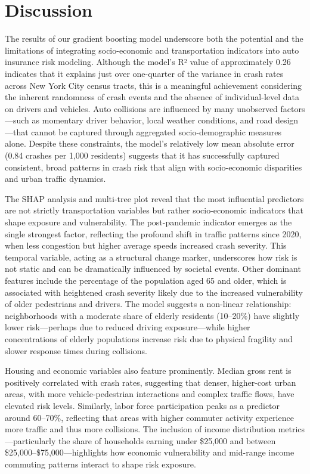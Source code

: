 \documentclass[
  number,
  review,
  3p]{elsarticle}
\begin{document}
\section{Discussion}\label{discussion}

The results of our gradient boosting model underscore both the potential
and the limitations of integrating socio-economic and transportation
indicators into auto insurance risk modeling. Although the model's R²
value of approximately 0.26 indicates that it explains just over
one-quarter of the variance in crash rates across New York City census
tracts, this is a meaningful achievement considering the inherent
randomness of crash events and the absence of individual-level data on
drivers and vehicles. Auto collisions are influenced by many unobserved
factors---such as momentary driver behavior, local weather conditions,
and road design---that cannot be captured through aggregated
socio-demographic measures alone. Despite these constraints, the model's
relatively low mean absolute error (0.84 crashes per 1,000 residents)
suggests that it has successfully captured consistent, broad patterns in
crash risk that align with socio-economic disparities and urban traffic
dynamics.

The SHAP analysis and multi-tree plot reveal that the most influential
predictors are not strictly transportation variables but rather
socio-economic indicators that shape exposure and vulnerability. The
post-pandemic indicator emerges as the single strongest factor,
reflecting the profound shift in traffic patterns since 2020, when less
congestion but higher average speeds increased crash severity. This
temporal variable, acting as a structural change marker, underscores how
risk is not static and can be dramatically influenced by societal
events. Other dominant features include the percentage of the population
aged 65 and older, which is associated with heightened crash severity
likely due to the increased vulnerability of older pedestrians and
drivers. The model suggests a non-linear relationship: neighborhoods
with a moderate share of elderly residents (10--20\%) have slightly
lower risk---perhaps due to reduced driving exposure---while higher
concentrations of elderly populations increase risk due to physical
fragility and slower response times during collisions.

Housing and economic variables also feature prominently. Median gross
rent is positively correlated with crash rates, suggesting that denser,
higher-cost urban areas, with more vehicle-pedestrian interactions and
complex traffic flows, have elevated risk levels. Similarly, labor force
participation peaks as a predictor around 60--70\%, reflecting that
areas with higher commuter activity experience more traffic and thus
more collisions. The inclusion of income distribution
metrics---particularly the share of households earning under \$25,000
and between \$25,000--\$75,000---highlights how economic vulnerability
and mid-range income commuting patterns interact to shape risk exposure.
\end{document}
